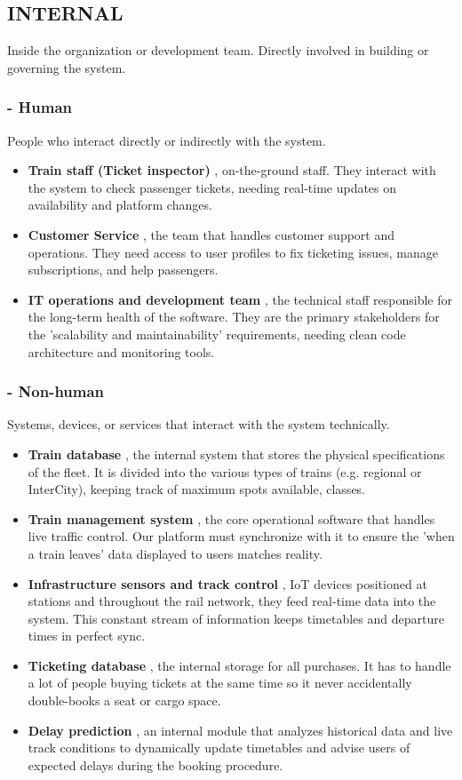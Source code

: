 \documentclass{article}
\begin{document}
\subsection{INTERNAL}
Inside the organization or development team. Directly involved in building or governing the system.

\subsubsection*{- Human}
People who interact directly or indirectly with the system.
\begin{itemize} 
    \item \textbf{Train staff (Ticket inspector)} \label{STK2}, on-the-ground staff. They interact with the system to check passenger tickets, needing real-time updates on availability and platform changes.
    \item \textbf{Customer Service} \label{STK3}, the team that handles customer support and operations. They need access to user profiles to fix ticketing issues, manage subscriptions, and help passengers. 
    \item \textbf{IT operations and development team} \label{STK5}, the technical staff responsible for the long-term health of the software. They are the primary stakeholders for the 'scalability and maintainability' requirements, needing clean code architecture and monitoring tools.
\end{itemize}

\subsubsection*{- Non-human}
Systems, devices, or services that interact with the system technically.
\begin{itemize}
    \item \textbf{Train database} \label{STK7}, the internal system that stores the physical specifications of the fleet. It is divided into the various types of trains (e.g. regional or InterCity), keeping track of maximum spots available, classes. 
    \item \textbf{Train management system} \label{STK8}, the core operational software that handles live traffic control. Our platform must synchronize with it to ensure the 'when a train leaves' data displayed to users matches reality. 
    \item \textbf{Infrastructure sensors and track control} \label{STK9}, IoT devices positioned at stations and throughout the rail network, they feed real-time data into the system. This constant stream of information keeps timetables and departure times in perfect sync. 
    \item \textbf{Ticketing database} \label{STK10}, the internal storage for all purchases. It has to handle a lot of people buying tickets at the same time so it never accidentally double-books a seat or cargo space.
    \item \textbf{Delay prediction} \label{STK11}, an internal module that analyzes historical data and live track conditions to dynamically update timetables and advise users of expected delays during the booking procedure.
\end{itemize}
\end{document}
